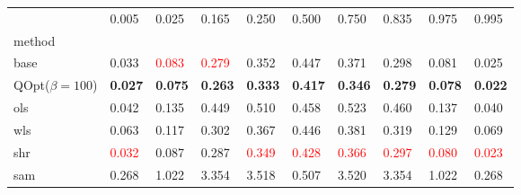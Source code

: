 \begin{tabular}{llllllllll}
\toprule
 & 0.005 & 0.025 & 0.165 & 0.250 & 0.500 & 0.750 & 0.835 & 0.975 & 0.995 \\
method &  &  &  &  &  &  &  &  &  \\
\midrule
base & 0.033 & \textcolor{red}{0.083} & \textcolor{red}{0.279} & 0.352 & 0.447 & 0.371 & 0.298 & 0.081 & 0.025 \\
\midrule
QOpt($\beta=100$) & \textbf{0.027} & \textbf{0.075} & \textbf{0.263} & \textbf{0.333} & \textbf{0.417} & \textbf{0.346} & \textbf{0.279} & \textbf{0.078} & \textbf{0.022} \\
ols & 0.042 & 0.135 & 0.449 & 0.510 & 0.458 & 0.523 & 0.460 & 0.137 & 0.040 \\
wls & 0.063 & 0.117 & 0.302 & 0.367 & 0.446 & 0.381 & 0.319 & 0.129 & 0.069 \\
shr & \textcolor{red}{0.032} & 0.087 & 0.287 & \textcolor{red}{0.349} & \textcolor{red}{0.428} & \textcolor{red}{0.366} & \textcolor{red}{0.297} & \textcolor{red}{0.080} & \textcolor{red}{0.023} \\
sam & 0.268 & 1.022 & 3.354 & 3.518 & 0.507 & 3.520 & 3.354 & 1.022 & 0.268 \\
\bottomrule
\end{tabular}